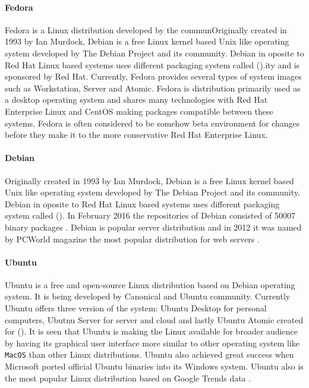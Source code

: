 \paragraph{Fedora}
Fedora is a Linux distribution developed by the communOriginally created in 1993 by Ian Murdock, Debian is a free Linux kernel based Unix like operating system developed by The Debian Project and its community. Debian in oposite to Red Hat Linux based systems uses different packaging system called  ().ity and is sponsored by Red Hat. Currently, Fedora provides several types of system images such as Workstation, Server and Atomic. Fedora is distribution primarily used as a desktop operating system and shares many technologies with Red Hat Enterprise Linux and CentOS making packages compatible between these systems. Fedora is often considered to be somehow beta environment for changes before they make it to the more conservative Red Hat Enterprise Linux.
\paragraph{Debian}
Originally created in 1993 by Ian Murdock, Debian is a free Linux kernel based Unix like operating system developed by The Debian Project and its community. Debian in oposite to Red Hat Linux based systems uses different packaging system called  (). In February 2016 the repositories of Debian consisted of 50007 binary packages \cite{debianfifty}. Debian is popular server distribution and in 2012 it was named by PCWorld magazine the most popular distribution for web servers \cite{debianpopular}.
\paragraph{Ubuntu}
Ubuntu is a free and open-source Linux distribution based on Debian operating system. It is being developed by 	Canonical and Ubuntu community. Currently Ubuntu offers three version of the system: Ubuntu Desktop for personal computers, Ubutnu Server for server and cloud and lastly Ubuntu Atomic created for  (). It is seen that Ubuntu is making the Linux available for broader audience by having its graphical user interface more similar to other operating system like \texttt{MacOS} than other Linux distributions. Ubuntu also achieved great success when Microsoft ported official Ubuntu binaries into its Windows system. Ubuntu also is the most popular Linux distribution based on Google Trends data \cite{linuxtrends}.
